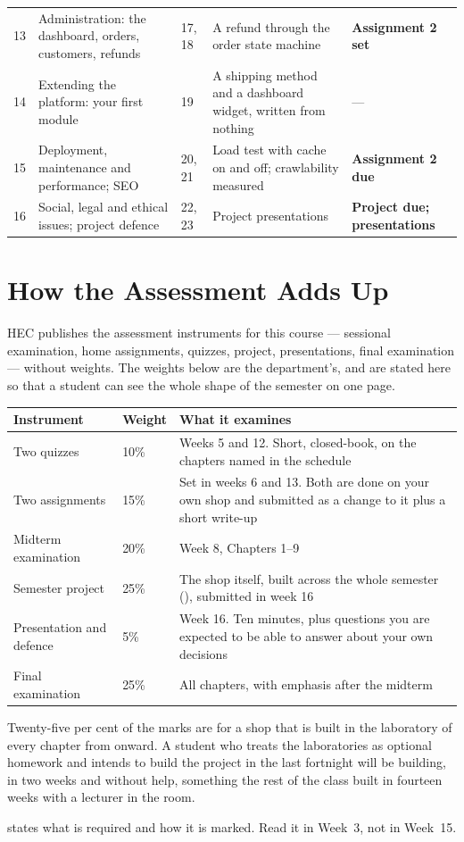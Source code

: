 \begin{longtable}{@{}L{1.1cm}L{3.2cm}L{1.8cm}L{4.4cm}L{3.9cm}@{}}
13 & Administration: the dashboard, orders, customers, refunds & 17, 18 & A
refund through the order state machine & \textbf{Assignment 2 set} \\
14 & Extending the platform: your first module & 19 & A shipping method and a
dashboard widget, written from nothing & --- \\
15 & Deployment, maintenance and performance; SEO & 20, 21 & Load test with
cache on and off; crawlability measured & \textbf{Assignment 2 due} \\
16 & Social, legal and ethical issues; project defence & 22, 23 & Project
presentations & \textbf{Project due; presentations} \\
\bottomrule
\end{longtable}

\section{How the Assessment Adds Up}

HEC publishes the assessment instruments for this course --- sessional
examination, home assignments, quizzes, project, presentations, final
examination --- without weights. The weights below are the department's, and
are stated here so that a student can see the whole shape of the semester on
one page.

\begin{longtable}{@{}L{4.6cm}L{2.0cm}L{8.4cm}@{}}
\toprule
{}
\textbf{Instrument} & \textbf{Weight} & \textbf{What it examines} \\
\midrule
\endhead
Two quizzes & 10\% & Weeks 5 and 12. Short, closed-book, on the chapters named
in the schedule \\
Two assignments & 15\% & Set in weeks 6 and 13. Both are done on your own shop
and submitted as a change to it plus a short write-up \\
Midterm examination & 20\% & Week 8, Chapters 1--9 \\
Semester project & 25\% & The shop itself, built across the whole semester
(), submitted in week 16 \\
Presentation and defence & 5\% & Week 16. Ten minutes, plus questions you are
expected to be able to answer about your own decisions \\
Final examination & 25\% & All chapters, with emphasis after the midterm \\
\bottomrule
\end{longtable}

\begin{alertbox}
Twenty-five per cent of the marks are for a shop that is built in the
laboratory of every chapter from  onward. A student who treats the
laboratories as optional homework and intends to build the project in the last
fortnight will be building, in two weeks and without help, something the rest
of the class built in fourteen weeks with a lecturer in the room.

\smallskip
{} states what is required and how it is marked. Read it in
Week~3, not in Week~15.
\end{alertbox}
